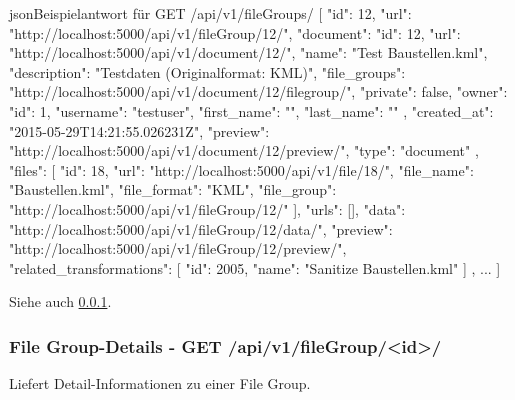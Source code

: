 \begin{srclst}{json}{Beispielantwort für GET /api/v1/fileGroups/}
[
    {
        "id": 12, 
        "url": "http://localhost:5000/api/v1/fileGroup/12/", 
        "document": {
            "id": 12, 
            "url": "http://localhost:5000/api/v1/document/12/", 
            "name": "Test Baustellen.kml", 
            "description": "Testdaten (Originalformat: KML)", 
            "file_groups": "http://localhost:5000/api/v1/document/12/filegroup/", 
            "private": false, 
            "owner": {
                "id": 1, 
                "username": "testuser", 
                "first_name": "", 
                "last_name": ""
            }, 
            "created_at": "2015-05-29T14:21:55.026231Z", 
            "preview": "http://localhost:5000/api/v1/document/12/preview/", 
            "type": "document"
        }, 
        "files": [
            {
                "id": 18, 
                "url": "http://localhost:5000/api/v1/file/18/", 
                "file_name": "Baustellen.kml", 
                "file_format": "KML", 
                "file_group": "http://localhost:5000/api/v1/fileGroup/12/"
            }
        ], 
        "urls": [], 
        "data": "http://localhost:5000/api/v1/fileGroup/12/data/", 
        "preview": "http://localhost:5000/api/v1/fileGroup/12/preview/", 
        "related_transformations": [
            {
                "id": 2005, 
                "name": "Sanitize Baustellen.kml"
            }
        ]
    },
    ...
]
\end{srclst}

Siehe auch \cref{sec:pd:api-filegroup-detail}.

\subsubsection{File Group-Details - GET /api/v1/fileGroup/<id>/} \label{sec:pd:api-filegroup-detail}
Liefert Detail-Informationen zu einer File Group.

